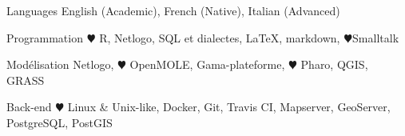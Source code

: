 

\begin{cvskills}

  \cvskill
  {Languages} %
  {English (Academic), French (Native), Italian (Advanced) } %

  \cvskill
    {Programmation} %
    {{\color{red} $\varheartsuit$} R, Netlogo, SQL et dialectes, \LaTeX, markdown, {\color{red} $\varheartsuit$}Smalltalk} %

  \cvskill
    {Modélisation} %
    {Netlogo, {\color{red} $\varheartsuit$} OpenMOLE, Gama-plateforme,
  {\color{red} $\varheartsuit$} Pharo, QGIS, GRASS} %

  \cvskill
    {Back-end} %
    {{\color{red} $\varheartsuit$} Linux \& Unix-like, Docker, Git, Travis CI, Mapserver, GeoServer, PostgreSQL, PostGIS} %

\end{cvskills}
